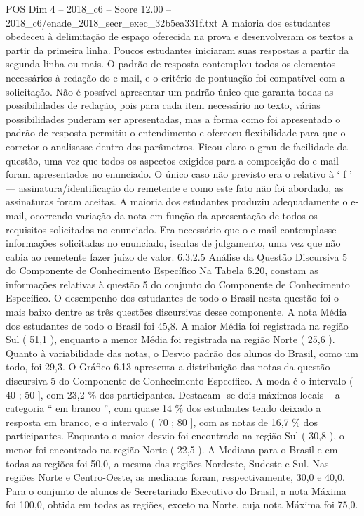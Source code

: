 \begin{textsample}{POS Dim 4 – 2018\_c6 – Score 12.00 – 2018\_c6/enade\_2018\_secr\_exec\_32b5ea331f.txt}
A maioria dos estudantes obedeceu à delimitação de espaço oferecida na prova e desenvolveram os textos a partir da primeira linha.
Poucos estudantes iniciaram suas respostas a partir da segunda linha ou mais.
O padrão de resposta contemplou todos os elementos necessários à redação do e-mail, e o critério de pontuação foi compatível com a solicitação.
Não é possível apresentar um padrão único que garanta todas as possibilidades de redação, pois para cada item necessário no texto, várias possibilidades puderam ser apresentadas, mas a forma como foi apresentado o padrão de resposta permitiu o entendimento e ofereceu flexibilidade para que o corretor o analisasse dentro dos parâmetros.
Ficou claro o grau de facilidade da questão, uma vez que todos os aspectos exigidos para a composição do e-mail foram apresentados no enunciado.
O único caso não previsto era o relativo à ‘ f ’ — assinatura/identificação do remetente e como este fato não foi abordado, as assinaturas foram aceitas.
A maioria dos estudantes produziu adequadamente o e-mail, ocorrendo variação da nota em função da apresentação de todos os requisitos solicitados no enunciado.
Era necessário que o e-mail contemplasse informações solicitadas no enunciado, isentas de julgamento, uma vez que não cabia ao remetente fazer juízo de valor. 6.3.2.5 Análise da Questão Discursiva 5 do Componente de Conhecimento Específico Na Tabela 6.20, constam as informações relativas à questão 5 do conjunto do Componente de Conhecimento Específico.
O desempenho dos estudantes de todo o Brasil nesta questão foi o mais baixo dentre as três questões discursivas desse componente.
A nota Média dos estudantes de todo o Brasil foi 45,8.
A maior Média foi registrada na região Sul ( 51,1 ), enquanto a menor Média foi registrada na região Norte ( 25,6 ).
Quanto à variabilidade das notas, o Desvio padrão dos alunos do Brasil, como um todo, foi 29,3.
O Gráfico 6.13 apresenta a distribuição das notas da questão discursiva 5 do Componente de Conhecimento Específico.
A moda é o intervalo ( 40 ; 50 ], com 23,2 \% dos participantes.
Destacam -se dois máximos locais – a categoria “ em branco ”, com quase 14 \% dos estudantes tendo deixado a resposta em branco, e o intervalo ( 70 ; 80 ], com as notas de 16,7 \% dos participantes.
Enquanto o maior desvio foi encontrado na região Sul ( 30,8 ), o menor foi encontrado na região Norte ( 22,5 ).
A Mediana para o Brasil e em todas as regiões foi 50,0, a mesma das regiões Nordeste, Sudeste e Sul.
Nas regiões Norte e Centro-Oeste, as medianas foram, respectivamente, 30,0 e 40,0.
Para o conjunto de alunos de Secretariado Executivo do Brasil, a nota Máxima foi 100,0, obtida em todas as regiões, exceto na Norte, cuja nota Máxima foi 75,0.

\end{textsample}
